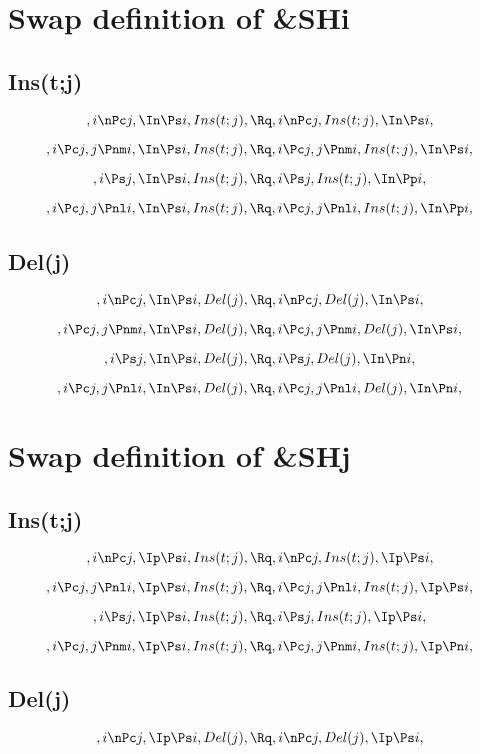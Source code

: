 \bigskip
\bigskip
\bigskip
\bigskip
\section{Swap definition of \&SHi}
\subsection{Ins(t;j)}
\[, i \nPc j, \In \Ps i, Ins(t;j), \Rq , i \nPc j, Ins(t;j), \In \Ps i, \]

\[, i \Pc j, j \Pnm i, \In \Ps i, Ins(t;j), \Rq , i \Pc j, j \Pnm i, Ins(t;j), \In \Ps i,\]

\[, i \Ps j, \In \Ps i, Ins(t;j), \Rq , i \Ps j, Ins(t;j), \In \Pp i,\]

\[, i \Pc j, j \Pnl i, \In \Ps i, Ins(t;j), \Rq , i \Pc j, j \Pnl i, Ins(t;j), \In \Pp i,\]

\bigskip
\bigskip
\subsection{Del(j)}
\[, i \nPc j, \In \Ps i, Del(j), \Rq , i \nPc j, Del(j), \In \Ps i, \]

\[, i \Pc j, j \Pnm i, \In \Ps i, Del(j), \Rq , i \Pc j, j \Pnm i, Del(j), \In \Ps i,\]

\[, i \Ps j, \In \Ps i, Del(j), \Rq , i \Ps j, Del(j), \In \Pn i,\]

\[, i \Pc j, j \Pnl i, \In \Ps i, Del(j), \Rq , i \Pc j, j \Pnl i, Del(j), \In \Pn i,\]




\bigskip
\bigskip
\section{Swap definition of \&SHj}
\subsection{Ins(t;j)}
\[, i \nPc j, \Ip \Ps i, Ins(t;j), \Rq , i \nPc j, Ins(t;j), \Ip \Ps i, \]

\[, i \Pc j, j \Pnl i, \Ip \Ps i, Ins(t;j), \Rq , i \Pc j, j \Pnl i, Ins(t;j), \Ip \Ps i,\]

\[, i \Ps j, \Ip \Ps i, Ins(t;j), \Rq , i \Ps j, Ins(t;j), \Ip \Ps i,\]

\[, i \Pc j, j \Pnm i, \Ip \Ps i, Ins(t;j), \Rq , i \Pc j, j \Pnm i, Ins(t;j), \Ip \Pn i,\]

\bigskip
\bigskip
\subsection{Del(j)}
\[, i \nPc j, \Ip \Ps i, Del(j), \Rq , i \nPc j, Del(j), \Ip \Ps i, \]

